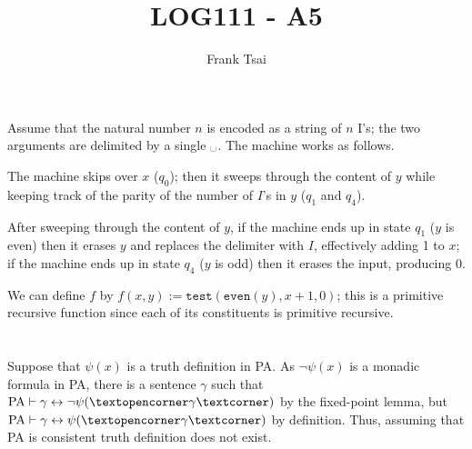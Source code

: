 \documentclass[a4paper]{article}
\title{LOG111 - A5}
\author{Frank Tsai}
\newcommand{\blank}{\text{\textvisiblespace}}
\newcommand{\el}[1]{\text{\textopencorner}#1\text{\textcorner}}
\begin{document}
\maketitle

\section{}
Assume that the natural number $n$ is encoded as a string of $n$ I's; the two arguments are delimited by a single $\blank$.
The machine works as follows.

The machine skips over $x$ ($q_0$); then it sweeps through the content of $y$ while keeping track of the parity of the number of $I$'s in $y$ ($q_1$ and $q_4$).

After sweeping through the content of $y$, if the machine ends up in state $q_1$ ($y$ is even) then it erases $y$ and replaces the delimiter with $I$, effectively adding 1 to $x$; if the machine ends up in state $q_4$ ($y$ is odd) then it erases the input, producing $0$.

\begin{center}
\end{center}

We can define $f$ by $f(x,y) := \texttt{test}(\texttt{even}(y),x+1,0)$; this is a primitive recursive function since each of its constituents is primitive recursive.

\section{}
Suppose that $\psi(x)$ is a truth definition in PA.
As $\lnot\psi(x)$ is a monadic formula in PA, there is a sentence $\gamma$ such that $\text{PA} \vdash \gamma \leftrightarrow \lnot\psi(\el{\gamma})$ by the fixed-point lemma, but $\text{PA} \vdash \gamma \leftrightarrow \psi(\el{\gamma})$ by definition.
Thus, assuming that PA is consistent truth definition does not exist.
\end{document}
